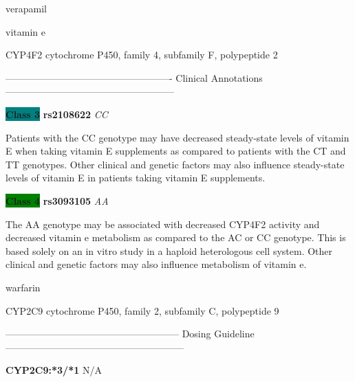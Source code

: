 \documentclass{resume} %
\begin{document}
\begin{rSection}{ verapamil }
\end{rSection}\begin{rSection}{ vitamin e }
\item[]

\begin{rSubsection}{ CYP4F2 }{ cytochrome P450, family 4, subfamily F, polypeptide 2 }{}{}
\item[]

\item[] ---------------------------------------------------- Clinical Annotations -----------------------------------------------------\newline
\item \textbf{\colorbox{teal} {Class 3}} \textbf{ rs2108622 } \textit{ CC }
\item[] Patients with the CC genotype may have decreased steady-state levels of vitamin E when taking vitamin E supplements as compared to patients with the CT and TT genotypes. Other clinical and genetic factors may also influence steady-state levels of vitamin E in patients taking vitamin E supplements.\item \textbf{\colorbox{green} {Class 4}} \textbf{ rs3093105 } \textit{ AA }
\item[] The AA genotype may be associated with decreased CYP4F2 activity and decreased vitamin e metabolism as compared to the AC or CC genotype. This is based solely on an in vitro study in a haploid heterologous cell system. Other clinical and genetic factors may also influence metabolism of vitamin e.
\end{rSubsection}

\end{rSection}\begin{rSection}{ warfarin }
\item[]

\begin{rSubsection}{ CYP2C9 }{ cytochrome P450, family 2, subfamily C, polypeptide 9 }{}{}
\item[]
\item[] ------------------------------------------------------ Dosing Guideline --------------------------------------------------------\newline
\item[]
\item[] \textbf{ CYP2C9:*3/*1 } N/A


\end{rSubsection}
\end{rSection}
\end{document}
